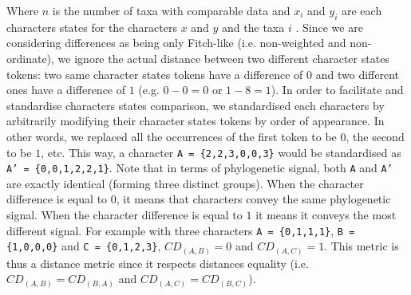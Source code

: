 \documentclass[12pt,letterpaper]{article}
\begin{document}
\noindent Where $n$ is the number of taxa with comparable data and $x_i$ and $y_i$ are each characters states for the characters $x$ and $y$ and the taxa $i$ \citep[i.e. the Gower distance;][]{GowerDist}.
Since we are considering differences as being only Fitch-like (i.e. non-weighted and non-ordinate), we ignore the actual distance between two different character states tokens: two same character states tokens have a difference of $0$ and two different ones have a difference of $1$ (e.g. $0 - 0 = 0$ or $1 - 8 = 1$).
In order to facilitate and standardise characters states comparison, we standardised each characters by arbitrarily modifying their character states tokens by order of appearance.
In other words, we replaced all the occurrences of the first token to be $0$, the second to be $1$, etc.
This way, a character \texttt{A = \{2,2,3,0,0,3\}} would be standardised as \texttt{A' = \{0,0,1,2,2,1\}}.
Note that in terms of phylogenetic signal, both \texttt{A} and \texttt{A'} are exactly identical (forming three distinct groups).
When the character difference is equal to $0$, it means that characters convey the same phylogenetic signal.
When the character difference is equal to $1$ it means it conveys the most different signal.
For example with three characters \texttt{A = \{0,1,1,1\}}, \texttt{B = \{1,0,0,0\}} and \texttt{C = \{0,1,2,3\}}, $CD_{(A,B)} = 0$ and $CD_{(A,C)} = 1$.
This metric is thus a distance metric since it respects distances equality (i.e. $CD_{(A,B)} = CD_{(B,A)}$ and $CD_{(A,C)} = CD_{(B,C)}$).
\end{document}
